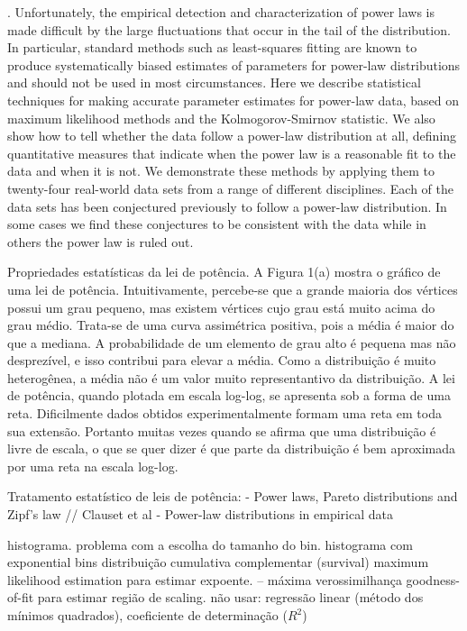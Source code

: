 \documentclass{article}
\begin{document}
. Unfortunately, the empirical detection and characterization of power laws is made difficult by the large fluctuations that occur in the tail of the distribution. In particular, standard methods such as least-squares fitting are known to produce systematically biased estimates of parameters for power-law distributions and should not be used in most circumstances. Here we describe statistical techniques for making accurate parameter estimates for power-law data, based on maximum likelihood methods and the Kolmogorov-Smirnov statistic. We also show how to tell whether the data follow a power-law distribution at all, defining quantitative measures that indicate when the power law is a reasonable fit to the data and when it is not. We demonstrate these methods by applying them to twenty-four real-world data sets from a range of different disciplines. Each of the data sets has been conjectured previously to follow a power-law distribution. In some cases we find these conjectures to be consistent with the data while in others the power law is ruled out.

Propriedades estatísticas da lei de potência. A Figura 1(a) mostra o gráfico de uma lei de potência. Intuitivamente, percebe-se que a grande maioria dos vértices possui um grau pequeno, mas existem vértices cujo grau está muito acima do grau médio. Trata-se de uma curva assimétrica positiva, pois a média é maior do que a mediana. A probabilidade de um elemento de grau alto é pequena mas não desprezível, e isso contribui para elevar a média. Como a distribuição é muito heterogênea, a média não é um valor muito representantivo da distribuição. A lei de potência, quando plotada em escala log-log, se apresenta sob a forma de uma reta. Dificilmente dados obtidos experimentalmente formam uma reta em toda sua extensão. Portanto muitas vezes quando se afirma que uma distribuição é livre de escala, o que se quer dizer é que parte da distribuição é bem aproximada por uma reta na escala log-log.

Tratamento estatístico de leis de potência:  \cite{Newman2005} - Power laws, Pareto distributions and Zipf's law   //   Clauset et al - Power-law distributions in empirical data \cite{Clauset2007}

histograma. problema com a escolha do tamanho do bin. histograma com exponential bins
distribuição cumulativa complementar (survival)
maximum likelihood estimation para estimar expoente. -- máxima verossimilhança
goodness-of-fit para estimar região de scaling.
não usar: regressão linear (método dos mínimos quadrados), coeficiente de determinação ($R^2$)
\end{document}
